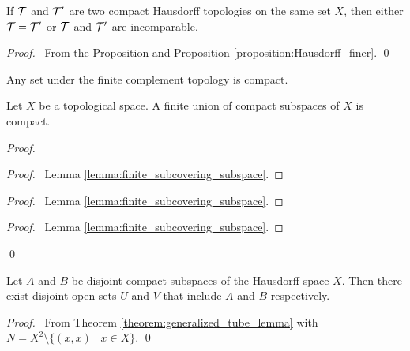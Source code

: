 \begin{corollary}
    If $\mathcal{T}$ and $\mathcal{T}'$ are two compact Hausdorff topologies on the same set $X$, then either $\mathcal{T} = \mathcal{T}'$ or $\mathcal{T}$ and $\mathcal{T}'$ are incomparable.
\end{corollary}

\begin{proof}
    \pf\ From the Proposition and Proposition \ref{proposition:Hausdorff_finer}. \qed
\end{proof}

\begin{example}
    Any set under the finite complement topology is compact.
\end{example}

\begin{proposition}
    \label{proposition:finite_union_compact}
    Let $X$ be a topological space. A finite union of compact subspaces of $X$ is compact.
\end{proposition}

\begin{proof}
    \pf
    \begin{proof}
        \pf\ Lemma \ref{lemma:finite_subcovering_subspace}.
    \end{proof}
    \begin{proof}
        \pf\ Lemma \ref{lemma:finite_subcovering_subspace}.
    \end{proof}
    \qedstep
    \begin{proof}
        \pf\ Lemma \ref{lemma:finite_subcovering_subspace}.
    \end{proof}
    \qed
\end{proof}

\begin{proposition}
    \label{proposition:disjoint_neighbourhoods_compact_Hausdorff}
    Let $A$ and $B$ be disjoint compact subspaces of the Hausdorff space $X$.
    Then there exist disjoint open sets $U$ and $V$ that include $A$ and $B$
    respectively.
\end{proposition}

\begin{proof}
    \pf\ From Theorem \ref{theorem:generalized_tube_lemma} with $N = X^2 \setminus \{ (x,x) \mid x \in X \}$. \qed
\end{proof}

